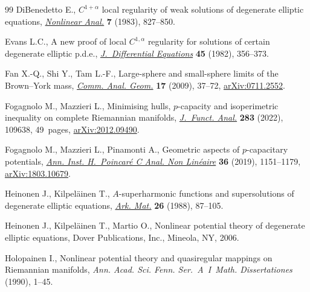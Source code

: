 \documentclass[10pt,a4paper]{amsart}
\numberwithin{equation}{section}
\begin{document}
\begin{thebibliography}{99}
DiBenedetto E., {$C^{1+\alpha}$} local regularity of weak solutions of
 degenerate elliptic equations, \href{https://doi.org/10.1016/0362-546X(83)90061-5}{\textit{Nonlinear Anal.}} \textbf{7} (1983),
 827--850.

Evans L.C., A new proof of local {$C^{1,\alpha }$} regularity for solutions of
 certain degenerate elliptic p.d.e., \href{https://doi.org/10.1016/0022-0396(82)90033-X}{\textit{J.~Differential Equations}}
 \textbf{45} (1982), 356--373.

Fan X.-Q., Shi Y., Tam L.-F., Large-sphere and small-sphere limits of the
 {B}rown--{Y}ork mass, \href{https://doi.org/10.4310/CAG.2009.v17.n1.a3}{\textit{Comm. Anal. Geom.}} \textbf{17} (2009), 37--72,
 \href{https://arxiv.org/abs/0711.2552}{arXiv:0711.2552}.

Fogagnolo M., Mazzieri L., Minimising hulls, {$p$}-capacity and isoperimetric
 inequality on complete {R}iemannian manifolds, \href{https://doi.org/10.1016/j.jfa.2022.109638}{\textit{J.~Funct. Anal.}}
 \textbf{283} (2022), 109638, 49~pages, \href{https://arxiv.org/abs/2012.09490}{arXiv:2012.09490}.

Fogagnolo M., Mazzieri L., Pinamonti A., Geometric aspects of {$p$}-capacitary
 potentials, \href{https://doi.org/10.1016/j.anihpc.2018.11.005}{\textit{Ann. Inst. H.~Poincar\'e C Anal. Non Lin\'eaire}}
 \textbf{36} (2019), 1151--1179, \href{https://arxiv.org/abs/1803.10679}{arXiv:1803.10679}.

Heinonen J., Kilpel\"ainen T., {$A$}-superharmonic functions and supersolutions
 of degenerate elliptic equations, \href{https://doi.org/10.1007/BF02386110}{\textit{Ark. Mat.}} \textbf{26} (1988),
 87--105.

Heinonen J., Kilpel\"ainen T., Martio O., Nonlinear potential theory of
 degenerate elliptic equations, Dover Publications, Inc., Mineola, NY, 2006.

Holopainen I., Nonlinear potential theory and quasiregular mappings on
 {R}iemannian manifolds, \textit{Ann. Acad. Sci. Fenn. Ser.~A~I~Math.
 Dissertationes} (1990), 1--45.


\end{thebibliography}
\end{document}
